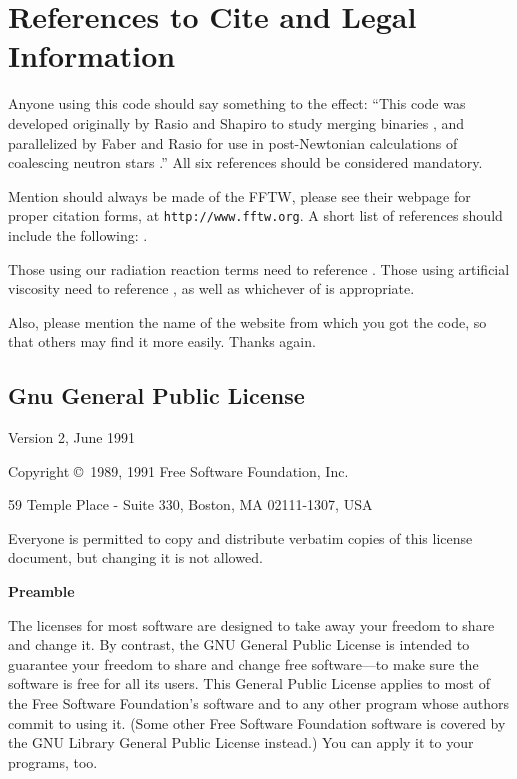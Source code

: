 \newpage
\section{References to Cite and Legal Information}
\label{legal}

Anyone using this code should say something to the effect: ``This
code was developed originally by Rasio and Shapiro to study merging binaries 
\citep{RS1,RS2,RS3}, and parallelized by Faber and Rasio for use in
post-Newtonian calculations of coalescing neutron stars
\citep{FR1,FR2,FR3}.''  All six references should be considered
mandatory.

Mention should always be made of the FFTW, please see their webpage
for proper citation forms, at {\tt http://www.fftw.org}.  
A short list of references should include the following: \citet{fftw2,fftw1}.

Those using our radiation reaction terms need to reference
\citet{BDS}.  Those using artificial viscosity need to reference
\citet{LSRS}, as well as whichever of \citet{claAV,newAV,balAV} is
appropriate.

Also, please mention the name of the website from which you got the
code, so that others may find it more easily.  Thanks again.

\subsection{Gnu General Public License}

\begin{center}
{\parindent 0in

Version 2, June 1991

Copyright \copyright\ 1989, 1991 Free Software Foundation, Inc.

\bigskip

59 Temple Place - Suite 330, Boston, MA  02111-1307, USA

\bigskip

Everyone is permitted to copy and distribute verbatim copies
of this license document, but changing it is not allowed.
}
\end{center}

\begin{center}
{\bf\large Preamble}
\end{center}


The licenses for most software are designed to take away your freedom to
share and change it.  By contrast, the GNU General Public License is
intended to guarantee your freedom to share and change free software---to
make sure the software is free for all its users.  This General Public
License applies to most of the Free Software Foundation's software and to
any other program whose authors commit to using it.  (Some other Free
Software Foundation software is covered by the GNU Library General Public
License instead.)  You can apply it to your programs, too.

